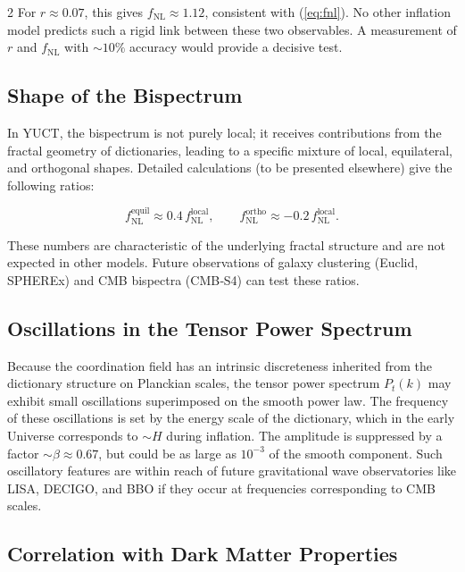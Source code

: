 \documentclass[12pt,a4paper]{article}
\begin{document}
\begin{multicols}{2}
		For \(r \approx 0.07\), this gives \(f_{\text{NL}} \approx 1.12\), consistent with (\ref{eq:fnl}). No other inflation model predicts such a rigid link between these two observables. A measurement of \(r\) and \(f_{\text{NL}}\) with \(\sim 10\%\) accuracy would provide a decisive test.
		
		\subsection{Shape of the Bispectrum}
		
		In YUCT, the bispectrum is not purely local; it receives contributions from the fractal geometry of dictionaries, leading to a specific mixture of local, equilateral, and orthogonal shapes. Detailed calculations (to be presented elsewhere) give the following ratios:
		
		\begin{equation}
			f_{\text{NL}}^{\text{equil}} \approx 0.4\, f_{\text{NL}}^{\text{local}}, \qquad
			f_{\text{NL}}^{\text{ortho}} \approx -0.2\, f_{\text{NL}}^{\text{local}}.
			\label{eq:fnl-shapes}
		\end{equation}
		
		These numbers are characteristic of the underlying fractal structure and are not expected in other models. Future observations of galaxy clustering (Euclid, SPHEREx) and CMB bispectra (CMB‑S4) can test these ratios.
		
		\subsection{Oscillations in the Tensor Power Spectrum}
		
		Because the coordination field has an intrinsic discreteness inherited from the dictionary structure on Planckian scales, the tensor power spectrum \(P_t(k)\) may exhibit small oscillations superimposed on the smooth power law. The frequency of these oscillations is set by the energy scale of the dictionary, which in the early Universe corresponds to \(\sim H\) during inflation. The amplitude is suppressed by a factor \(\sim \beta \approx 0.67\), but could be as large as \(10^{-3}\) of the smooth component. Such oscillatory features are within reach of future gravitational wave observatories like LISA, DECIGO, and BBO if they occur at frequencies corresponding to CMB scales.
		
		\subsection{Correlation with Dark Matter Properties}
		

\end{multicols}
\end{document}
